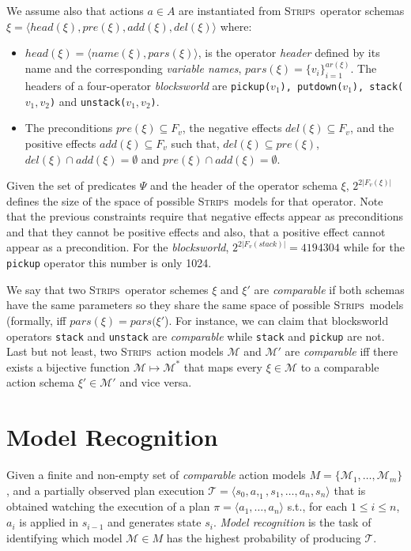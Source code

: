 \documentclass[letterpaper]{article} %
\newcommand{\tup}[1]{{\langle #1 \rangle}}
\newcommand{\strips}{\textsc{Strips}}     %
\begin{document}
We assume also that actions $a\in A$ are instantiated from \strips\ operator schemas $\xi=\tup{head(\xi),pre(\xi),add(\xi),del(\xi)}$ where:
\begin{itemize}
\item $head(\xi)=\tup{name(\xi),pars(\xi)}$, is the operator {\em header} defined by its name and the corresponding {\em variable names}, $pars(\xi)=\{v_i\}_{i=1}^{ar(\xi)}$. The headers of a four-operator {\em blocksworld} are {\small\tt pickup($v_1$), putdown($v_1$), stack($v_1,v_2$)} and {\small\tt unstack($v_1,v_2$)}.
\item The preconditions $pre(\xi)\subseteq F_v$, the negative effects $del(\xi)\subseteq F_v$, and the positive effects $add(\xi)\subseteq F_v$ such that, $del(\xi)\subseteq pre(\xi)$, $del(\xi)\cap add(\xi)=\emptyset$ and $pre(\xi)\cap add(\xi)=\emptyset$.
\end{itemize}
Given the set of predicates $\Psi$ and the header of the operator schema $\xi$, $2^{2|F_v(\xi)|}$ defines the size of the space of possible \strips\ models for that operator. Note that the previous constraints require that negative effects appear as preconditions and that they cannot be positive effects and also, that a positive effect cannot appear as a precondition. For the {\em blocksworld}, $2^{2|F_v(stack)|}=4194304$ while for the {\small\tt pickup} operator this number is only 1024.

We say that two \strips\ operator schemes $\xi$ and $\xi'$ are {\em comparable} if both schemas have the same parameters so they share the same space of possible \strips\ models (formally, iff $pars(\xi)=pars(\xi'$). For instance, we can claim that blocksworld operators {\small\tt stack} and {\small\tt unstack} are {\em comparable} while  {\small\tt stack} and {\small\tt pickup} are not. Last but not least, two \strips\ action models $\mathcal{M}$ and $\mathcal{M}'$ are {\em comparable} iff there exists a bijective function $\mathcal{M} \mapsto \mathcal{M}^*$ that maps every $\xi\in\mathcal{M}$ to a comparable action schema $\xi'\in\mathcal{M'}$ and vice versa.


\section{Model Recognition}
\label{sec:recognition}
Given a finite and non-empty set of {\em comparable} action models $M=\{\mathcal{M}_1,\ldots,\mathcal{M}_m\}$, and a partially observed plan execution $\mathcal{T}=\tup{s_0,a,_1,s_1,\ldots,a_n,s_{n}}$ that is obtained watching the execution of a plan $\pi=\tup{a_1, \ldots, a_n}$ s.t., for each {\small $1\leq i\leq n$}, $a_i$ is applied in $s_{i-1}$ and generates state $s_i$. {\em Model recognition} is the task of identifying which model $\mathcal{M}\in M$ has the highest probability of producing $\mathcal{T}$.
\end{document}
